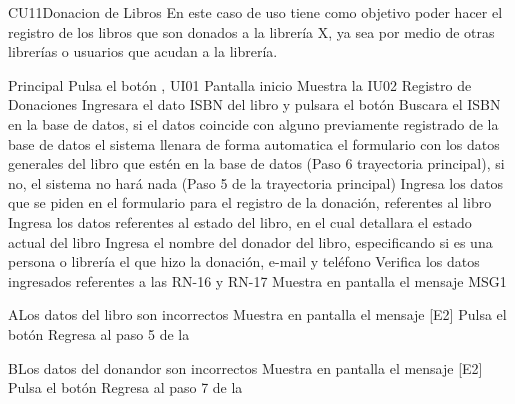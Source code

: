 	\begin{UseCase}{CU11}{Donacion de Libros}{
		En este caso de uso tiene como objetivo poder hacer el registro de los libros que son donados a la librería X, ya sea por medio de otras librerías o usuarios que acudan a la librería.
}
	\end{UseCase}

	\begin{UCtrayectoria}{Principal}
		\UCpaso [\UCactor]Pulsa el botón , UI01 Pantalla inicio
		\UCpaso Muestra la IU02 Registro de Donaciones
		\UCpaso [\UCactor] Ingresara el dato ISBN del libro y pulsara el botón 
		\UCpaso Buscara el ISBN en la base de datos, si el datos coincide con alguno previamente registrado de la base de datos el sistema llenara de forma automatica el formulario con los datos generales del libro que estén en la base de datos (Paso 6 trayectoria principal), si no, el sistema no hará nada (Paso 5 de la trayectoria principal)
		\UCpaso [\UCactor] Ingresa los datos que se piden en el formulario para el registro de la donación, referentes al libro
		\UCpaso [\UCactor] Ingresa los datos referentes al estado del libro, en el cual detallara el estado actual del libro
		\UCpaso [\UCactor] Ingresa el nombre del donador del libro, especificando si es una persona o librería el que hizo la donación, e-mail y teléfono 
		\UCpaso Verifica los datos ingresados referentes a las RN-16  y RN-17
		\UCpaso Muestra en pantalla el mensaje MSG1
	\end{UCtrayectoria}
		
		\begin{UCtrayectoriaA}{A}{Los datos del libro son incorrectos}
			\UCpaso Muestra en pantalla el mensaje [E2]
			\UCpaso[\UCactor] Pulsa el botón 
			\UCpaso Regresa al paso 5 de la 
		\end{UCtrayectoriaA}
		
		\begin{UCtrayectoriaA}{B}{Los datos del donandor son incorrectos}
			\UCpaso Muestra en pantalla el mensaje [E2]
			\UCpaso [\UCactor] Pulsa el botón 
			\UCpaso Regresa al paso 7 de la 
		\end{UCtrayectoriaA}